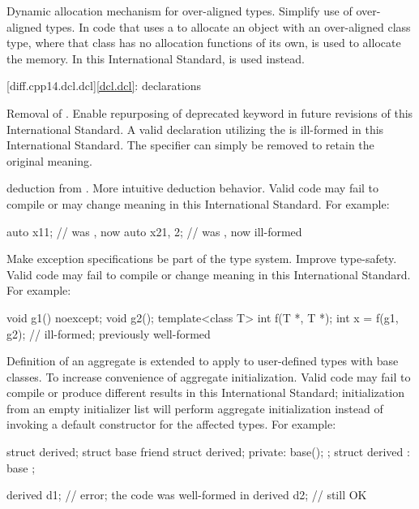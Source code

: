 \change
Dynamic allocation mechanism for over-aligned types.
\rationale
Simplify use of over-aligned types.
\effect
In \CppXIV{} code that uses a 
to allocate an object with an over-aligned class type,
where that class has no allocation functions of its own,
is used to allocate the memory.
In this International Standard,
is used instead.

[diff.cpp14.dcl.dcl]{\ref{dcl.dcl}: declarations}

%
\change
Removal of  .
\rationale
Enable repurposing of deprecated keyword in future revisions of this International Standard.
\effect
A valid \CppXIV{} declaration utilizing the 
 is ill-formed in this International Standard.
The specifier can simply be removed to retain the original meaning.

\change
{} deduction from .
\rationale
More intuitive deduction behavior.
\effect
Valid \CppXIV{} code may fail to compile or may change meaning
in this International Standard. For example:
\begin{codeblock}
auto x1{1};         // was , now 
auto x2{1, 2};      // was , now ill-formed
\end{codeblock}

\change
Make exception specifications be part of the type system.
\rationale
Improve type-safety.
\effect
Valid \CppXIV{} code may fail to compile or change meaning in this
International Standard.
For example:
\begin{codeblock}
void g1() noexcept;
void g2();
template<class T> int f(T *, T *);
int x = f(g1, g2);              // ill-formed; previously well-formed
\end{codeblock}

\change
Definition of an aggregate is extended
to apply to user-defined types with base classes.
\rationale
To increase convenience of aggregate initialization.
\effect
Valid \CppXIV{} code may fail to compile or produce different results in this
International Standard; initialization from an empty initializer list will
perform aggregate initialization instead of invoking a default constructor
for the affected types.
For example:
\begin{codeblock}
struct derived;
struct base {
  friend struct derived;
private:
  base();
};
struct derived : base {};

derived d1{};       // error; the code was well-formed in \CppXIV{}
derived d2;         // still OK
\end{codeblock}

